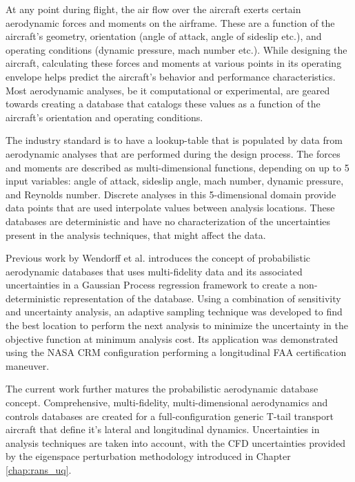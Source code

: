 At any point during flight, the air flow over the aircraft exerts certain aerodynamic forces and moments on the airframe. These are a function of the aircraft's geometry, orientation (angle of attack, angle of sideslip etc.), and operating conditions (dynamic pressure, mach number etc.). While designing the aircraft, calculating these forces and moments at various points in its operating envelope helps predict the aircraft's behavior and performance characteristics. Most aerodynamic analyses, be it computational or experimental, are geared towards creating a database that catalogs these values as a function of the aircraft's orientation and operating conditions.

The industry standard is to have a lookup-table that is populated by data from aerodynamic analyses that are performed during the design process. The forces and moments are described as multi-dimensional functions, depending on up to 5 input variables: angle of attack, sideslip angle, mach number, dynamic pressure, and Reynolds number. Discrete analyses in this 5-dimensional domain provide data points that are used interpolate values between analysis locations. These databases are deterministic and have no characterization of the uncertainties present in the analysis techniques, that might affect the data. 

Previous work by Wendorff et al. \cite{wendorff_combining_2016} introduces the concept of probabilistic aerodynamic databases that uses multi-fidelity data and its associated uncertainties in a Gaussian Process regression framework to create a non-deterministic representation of the database. Using a combination of sensitivity and uncertainty analysis, an adaptive sampling technique was developed to find the best location to perform the next analysis to minimize the uncertainty in the objective function at minimum analysis cost. Its application was demonstrated using the NASA CRM configuration performing a longitudinal FAA certification maneuver. 

The current work further matures the probabilistic aerodynamic database concept. Comprehensive, multi-fidelity, multi-dimensional aerodynamics and controls databases are created for a full-configuration generic T-tail transport aircraft that define it's lateral and longitudinal dynamics. Uncertainties in analysis techniques are taken into account, with the CFD uncertainties provided by the eigenspace perturbation methodology introduced in Chapter \ref{chap:rans_uq}.

